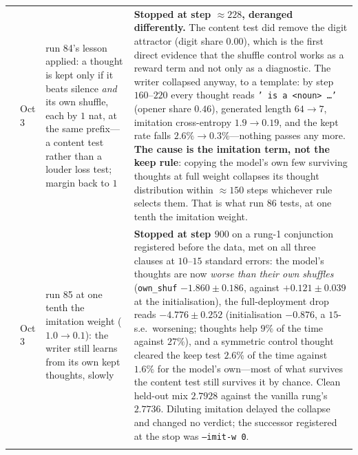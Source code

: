 \documentclass{article} %
\begin{document}
{\begin{longtable}{@{}llp{3.6cm}p{5.6cm}@{}}
\addlinespace
85 & Oct 3 & run 84's lesson applied: a thought is kept only if it beats silence \emph{and} its own shuffle, each by $1$ nat, at the same prefix---a content test rather than a louder loss test; margin back to $1$ & \textbf{Stopped at step ${\approx}228$, deranged differently.} The content test did remove the digit attractor (digit share $0.00$), which is the first direct evidence that the shuffle control works as a reward term and not only as a diagnostic. The writer collapsed anyway, to a template: by step $160$--$220$ every thought reads \texttt{' is a <noun> \ldots'} (opener share $0.46$), generated length $64 \to 7$, imitation cross-entropy $1.9 \to 0.19$, and the kept rate falls $2.6\% \to 0.3\%$---nothing passes any more. \textbf{The cause is the imitation term, not the keep rule}: copying the model's own few surviving thoughts at full weight collapses its thought distribution within ${\approx}150$ steps whichever rule selects them. That is what run 86 tests, at one tenth the imitation weight. \\
\addlinespace
86 & Oct 3 & run 85 at one tenth the imitation weight ($1.0 \to 0.1$): the writer still learns from its own kept thoughts, slowly & \textbf{Stopped at step $900$} on a rung-1 conjunction registered before the data, met on all three clauses at $10$--$15$ standard errors: the model's thoughts are now \emph{worse than their own shuffles} (\texttt{own\_shuf} $-1.860 \pm 0.186$, against $+0.121 \pm 0.039$ at the initialisation), the full-deployment drop reads $-4.776 \pm 0.252$ (initialisation $-0.876$, a $15$-s.e.\ worsening; thoughts help $9\%$ of the time against $27\%$), and a symmetric control thought cleared the keep test $2.6\%$ of the time against $1.6\%$ for the model's own---most of what survives the content test still survives it by chance. Clean held-out mix $2.7928$ against the vanilla rung's $2.7736$. Diluting imitation delayed the collapse and changed no verdict; the successor registered at the stop was \texttt{--imit-w 0}. \\
\addlinespace

\end{longtable}}
\end{document}

